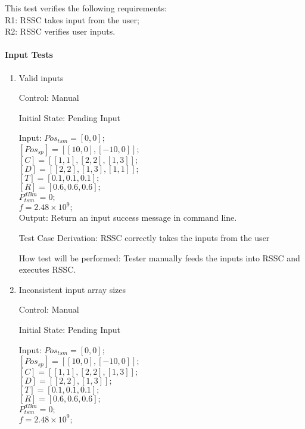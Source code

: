 \documentclass[12pt, titlepage]{article}
\begin{document}
This test verifies the following requirements: \\
\indent  R1: RSSC takes input from the user;\\
\indent  R2: RSSC verifies user inputs.\\
		
\paragraph{Input Tests}

\begin{enumerate}

\item{Valid inputs\\}

Control: Manual
					
Initial State: Pending Input
					
Input:
$Pos_{tsm} = [0,0];$\\
$[Pos_{sp}] = [[10,0],[-10,0]];$\\
$[C] = [[1,1],[2,2],[1,3]];$\\
$[D] = [[2,2],[1,3],[1,1]];$\\
$[T] = [0.1,0.1,0.1];$\\
$[R] = [0.6,0.6,0.6];$\\
$P_{tsm}^{dBm} = 0;$\\
$f = 2.48\times10^{9};$\\

Output: Return an input success message in command line.

Test Case Derivation: RSSC correctly takes the inputs from the user
					
How test will be performed: Tester manually feeds the inputs into
RSSC and executes RSSC.
					
					
\item{Inconsistent input array sizes\\}

Control: Manual
					
Initial State: Pending Input
					
Input: 
$Pos_{tsm} = [0,0];$\\
$[Pos_{sp}] = [[10,0],[-10,0]];$\\
$[C] = [[1,1],[2,2],[1,3]];$\\
$[D] = [[2,2],[1,3]];$\\
$[T] = [0.1,0.1,0.1];$\\
$[R] = [0.6,0.6,0.6];$\\
$P_{tsm}^{dBm} = 0;$\\
$f = 2.48\times10^{9};$\\
					

\end{enumerate}
\end{document}
